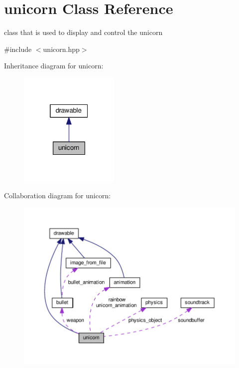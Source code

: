 \hypertarget{classunicorn}{}\section{unicorn Class Reference}
\label{classunicorn}


class that is used to display and control the unicorn  




{\ttfamily \#include $<$unicorn.\+hpp$>$}



Inheritance diagram for unicorn\+:\nopagebreak
\begin{figure}[H]
\begin{center}
\leavevmode
\includegraphics[width=136pt]{classunicorn__inherit__graph}
\end{center}
\end{figure}


Collaboration diagram for unicorn\+:
\nopagebreak
\begin{figure}[H]
\begin{center}
\leavevmode
\includegraphics[width=350pt]{classunicorn__coll__graph}
\end{center}
\end{figure}
